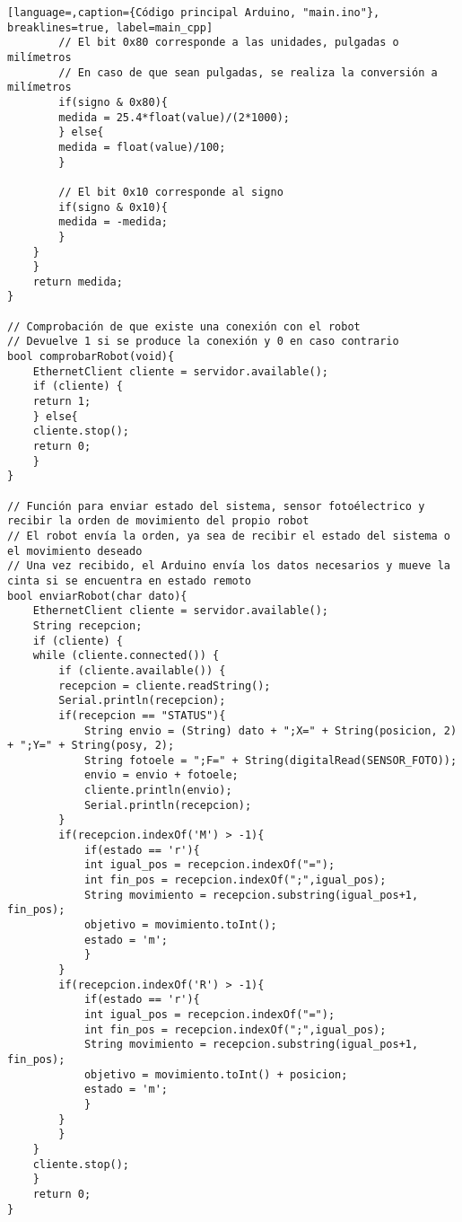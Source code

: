 \begin{lstlisting}[language=,caption={Código principal Arduino, "main.ino"}, breaklines=true, label=main_cpp]
        // El bit 0x80 corresponde a las unidades, pulgadas o milímetros
        // En caso de que sean pulgadas, se realiza la conversión a milímetros
        if(signo & 0x80){
        medida = 25.4*float(value)/(2*1000);
        } else{
        medida = float(value)/100;
        } 

        // El bit 0x10 corresponde al signo
        if(signo & 0x10){
        medida = -medida;
        }
    }
    }
    return medida;
}

// Comprobación de que existe una conexión con el robot
// Devuelve 1 si se produce la conexión y 0 en caso contrario
bool comprobarRobot(void){
    EthernetClient cliente = servidor.available();
    if (cliente) {
    return 1;
    } else{
    cliente.stop();
    return 0;
    }
}

// Función para enviar estado del sistema, sensor fotoélectrico y recibir la orden de movimiento del propio robot
// El robot envía la orden, ya sea de recibir el estado del sistema o el movimiento deseado
// Una vez recibido, el Arduino envía los datos necesarios y mueve la cinta si se encuentra en estado remoto
bool enviarRobot(char dato){
    EthernetClient cliente = servidor.available();
    String recepcion;
    if (cliente) {
    while (cliente.connected()) {
        if (cliente.available()) {
        recepcion = cliente.readString();
        Serial.println(recepcion);
        if(recepcion == "STATUS"){
            String envio = (String) dato + ";X=" + String(posicion, 2) + ";Y=" + String(posy, 2);
            String fotoele = ";F=" + String(digitalRead(SENSOR_FOTO));
            envio = envio + fotoele;
            cliente.println(envio);
            Serial.println(recepcion);
        }
        if(recepcion.indexOf('M') > -1){
            if(estado == 'r'){
            int igual_pos = recepcion.indexOf("=");
            int fin_pos = recepcion.indexOf(";",igual_pos);
            String movimiento = recepcion.substring(igual_pos+1, fin_pos);
            objetivo = movimiento.toInt();
            estado = 'm';
            }
        }
        if(recepcion.indexOf('R') > -1){
            if(estado == 'r'){
            int igual_pos = recepcion.indexOf("=");
            int fin_pos = recepcion.indexOf(";",igual_pos);
            String movimiento = recepcion.substring(igual_pos+1, fin_pos);
            objetivo = movimiento.toInt() + posicion;
            estado = 'm';
            }
        }
        }
    }
    cliente.stop();
    }
    return 0;
}    
\end{lstlisting}